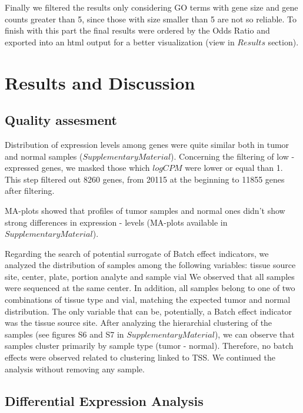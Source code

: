 \documentclass[9pt,twocolumn,twoside]{gsajnl}
\begin{document}
Finally we filtered the results only considering GO terms with gene size and gene counts greater than 5, since those with size smaller than 5 are not so reliable. To finish with this part the final results were ordered by the Odds Ratio and exported into an html output for a better visualization (view in $Results$ section).

\section*{Results and Discussion}
\subsection*{Quality assesment} 
\vspace{1mm}

Distribution of expression levels among genes were quite similar both in tumor and normal samples ($Supplementary Material$). Concerning the filtering of low - expressed genes, we masked those which $log CPM$ were lower or equal than 1. This step filtered out 8260 genes, from 20115 at the beginning to 11855 genes after filtering.

MA-plots showed that profiles of tumor samples and normal ones didn't show strong differences in expression - levels (MA-plots available in $Supplementary Material$).
\vspace{1mm}

Regarding the search of potential surrogate of Batch effect indicators, we analyzed the distribution of samples among the following variables: tissue source site, center, plate, portion analyte and sample vial We observed that all samples were sequenced at the same center. In addition, all samples belong to one of two combinations of tissue type and vial, matching the expected tumor and normal distribution. The only variable that can be, potentially, a Batch effect indicator was the tissue source site. After analyzing the hierarchial clustering of the samples (see figures S6 and S7 in $Supplementary Material$), we can observe that samples cluster primarily by sample type (tumor - normal). Therefore, no batch effects were observed related to clustering linked to TSS. We continued the analysis without removing any sample.
\vspace{2mm}

\subsection*{Differential Expression Analysis} 
\vspace{2mm}
\end{document}
